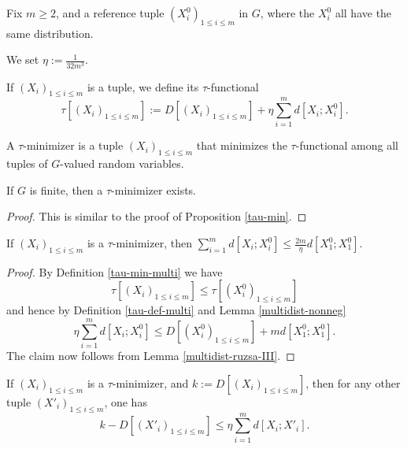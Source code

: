 Fix $m \geq 2$, and a reference tuple $(X^0_i)_{1 \leq i \leq m}$ in $G$, where the $X^0_i$ all have the same distribution.

\begin{definition}[$\eta$]\label{eta-def-multi}
We set $\eta := \frac{1}{32m^3}$.
\end{definition}

\begin{definition}\label{tau-def-multi}  If $(X_i)_{1 \leq i \leq m}$ is a tuple, we define its $\tau$-functional
$$ \tau[ (X_i)_{1 \leq i \leq m}] := D[(X_i)_{1 \leq i \leq m}] + \eta \sum_{i=1}^m d[X_i; X^0_i].$$
\end{definition}

\begin{definition}\label{tau-min-multi}  A $\tau$-minimizer is a tuple $(X_i)_{1 \leq i \leq m}$ that minimizes the $\tau$-functional among all tuples of $G$-valued random variables.
\end{definition}

\begin{proposition}\label{tau-min-exist-multi}  If $G$ is finite, then a $\tau$-minimizer exists.
\end{proposition}

\begin{proof} This is similar to the proof of Proposition \ref{tau-min}.
\end{proof}

\begin{proposition}\label{tau-ref}  If $(X_i)_{1 \leq i \leq m}$ is a $\tau$-minimizer, then $\sum_{i=1}^m d[X_i; X^0_i] \leq \frac{2m}{\eta} d[X^0_1; X^0_1]$.
\end{proposition}

\begin{proof}  By Definition \ref{tau-min-multi} we have
  $$ \tau[ (X_i)_{1 \leq i \leq m}] \leq \tau[ (X^0_i)_{1 \leq i \leq m}]$$
and hence by Definition \ref{tau-def-multi} and Lemma \ref{multidist-nonneg}
$$ \eta \sum_{i=1}^m d[X_i; X^0_i] \leq D[(X^0_i)_{1 \leq i \leq m}] + m d[X^0_1; X^0_1].$$
The claim now follows from Lemma \ref{multidist-ruzsa-III}.
\end{proof}

\begin{lemma}\label{multidist-lower}  If  $(X_i)_{1 \leq i \leq m}$ is a $\tau$-minimizer, and $k := D[(X_i)_{1 \leq i \leq m}]$, then for any other tuple $(X'_i)_{1 \leq i \leq m}$, one has
  $$ k - D[(X'_i)_{1 \leq i \leq m}] \leq \eta \sum_{i=1}^m d[X_i; X'_i].$$
\end{lemma}

